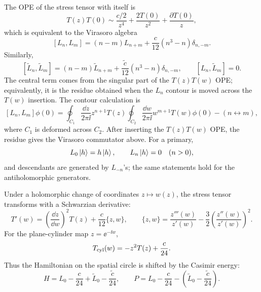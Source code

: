 The OPE of the stress tensor with itself is
\[
  T(z)T(0)
  \sim
  \frac{c/2}{z^4}+\frac{2T(0)}{z^2}+\frac{\partial T(0)}{z},
\]
which is equivalent to the Virasoro algebra
\[
  [L_n,L_m]=(n-m)L_{n+m}
  +\frac{c}{12}(n^3-n)\delta_{n,-m}.
\]
Similarly,
\[
  [\widetilde L_n,\widetilde L_m]
  =
  (n-m)\widetilde L_{n+m}
  +\frac{\widetilde c}{12}(n^3-n)\delta_{n,-m},
  \qquad
  [L_n,\widetilde L_m]=0.
\]
The central term comes from the singular part of the \(T(z)T(w)\) OPE;
equivalently, it is the residue obtained when the \(L_n\) contour is
moved across the \(T(w)\) insertion.
The contour calculation is
\[
  [L_n,L_m]\phi(0)
  =
  \oint_{C_1}\frac{\dd z}{2\pi\ii}z^{n+1}T(z)
  \oint_{C_2}\frac{\dd w}{2\pi\ii}w^{m+1}T(w)\phi(0)
  -(n\leftrightarrow m),
\]
where \(C_1\) is deformed across \(C_2\).  After inserting the
\(T(z)T(w)\) OPE, the residue gives the Virasoro commutator above.
For a primary,
\[
  L_0\ket h=h\ket h,\qquad
  L_n\ket h=0\quad (n>0),
\]
and descendants are generated by \(L_{-n}\)'s; the same statements hold
for the antiholomorphic generators.

Under a holomorphic change of coordinates \(z\mapsto w(z)\), the stress
tensor transforms with a Schwarzian derivative:
\[
  T'(w)
  =
  \left(\frac{\dd z}{\dd w}\right)^2T(z)
  +\frac c{12}\{z,w\},
  \qquad
  \{z,w\}
  =
  \frac{z'''(w)}{z'(w)}
  -\frac32\left(\frac{z''(w)}{z'(w)}\right)^2 .
\]
For the plane-cylinder map \(z=\ee^{-\ii w}\),
\[
  T_{\rm cyl}(w)=-z^2T(z)+\frac c{24}.
\]
Thus the Hamiltonian on the spatial circle is shifted by the Casimir
energy:
\[
  H=L_0-\frac c{24}+\widetilde L_0-\frac{\widetilde c}{24},
  \qquad
  P=L_0-\frac c{24}-(\widetilde L_0-\frac{\widetilde c}{24}).
\]

